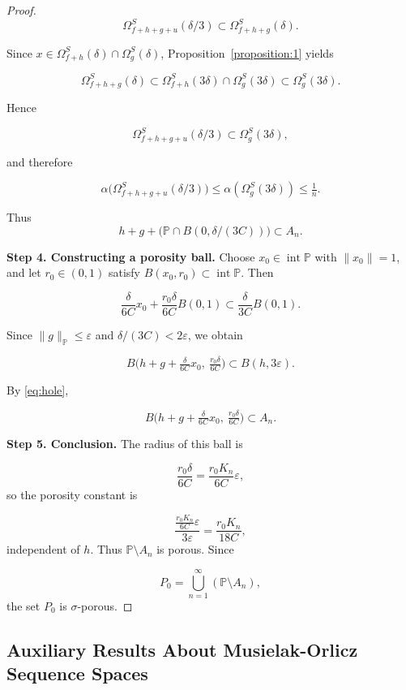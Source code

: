 \documentclass[12pt]{article}
\theoremstyle{thmstyleone}%
\theoremstyle{thmstyletwo}%
\theoremstyle{thmstylethree}%
\begin{document}
{{\begin{proof}
\[
\Omega_{f+h+g+u}^S(\delta/3)
\subset \Omega_{f+h+g}^S(\delta).
\]



Since $x\in\Omega_{f+h}^S(\delta)\cap\Omega_g^S(\delta)$,  
Proposition~\ref{proposition:1} yields


\[
\Omega_{f+h+g}^S(\delta)
\subset \Omega_{f+h}^S(3\delta)\cap \Omega_g^S(3\delta)
\subset \Omega_g^S(3\delta).
\]


Hence


\[
\Omega_{f+h+g+u}^S(\delta/3)\subset \Omega_g^S(3\delta),
\]


and therefore


\[
\alpha\big(\Omega_{f+h+g+u}^S(\delta/3)\big)
\le \alpha(\Omega_g^S(3\delta))
\le \tfrac1n.
\]


Thus
\begin{equation}\label{eq:hole}
h+g+\big(\mathbb{P}\cap B(0,\delta/(3C))\big)\subset A_n.
\end{equation}

\medskip
\noindent\textbf{Step 4. Constructing a porosity ball.}
Choose $x_0\in\operatorname{int}\mathbb{P}$ with $\|x_0\|=1$, and let $r_0\in(0,1)$ satisfy
$B(x_0,r_0)\subset\operatorname{int}\mathbb{P}$.  
Then


\[
\frac{\delta}{6C}x_0 + \frac{r_0\delta}{6C}B(0,1)
\subset \frac{\delta}{3C}B(0,1).
\]


Since $\|g\|_{\mathbb{P}}\le\varepsilon$ and $\delta/(3C)<2\varepsilon$, we obtain


\[
B\Big(h+g+\tfrac{\delta}{6C}x_0,\ \tfrac{r_0\delta}{6C}\Big)
\subset B(h,3\varepsilon).
\]


By \eqref{eq:hole},


\[
B\Big(h+g+\tfrac{\delta}{6C}x_0,\ \tfrac{r_0\delta}{6C}\Big)
\subset A_n.
\]



\medskip
\noindent\textbf{Step 5. Conclusion.}
The radius of this ball is


\[
\frac{r_0\delta}{6C}
=\frac{r_0K_n}{6C}\varepsilon,
\]
so the porosity constant is


\[
\frac{\frac{r_0K_n}{6C}\varepsilon}{3\varepsilon}
=\frac{r_0K_n}{18C},
\]
independent of $h$.  
Thus $\mathbb{P}\setminus A_n$ is porous.  
Since


\[
P_0=\bigcup_{n=1}^\infty (\mathbb{P}\setminus A_n),
\]
the set $P_0$ is $\sigma$-porous.
\end{proof}
}

  
 
\subsection{Auxiliary Results About Musielak-Orlicz Sequence Spaces}

}
\end{document}
